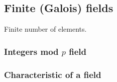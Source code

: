 
\subsection{Finite (Galois) fields}

Finite number of elements.

\subsubsection{Integers mod \(p\) field}

\subsubsection{Characteristic of a field}

